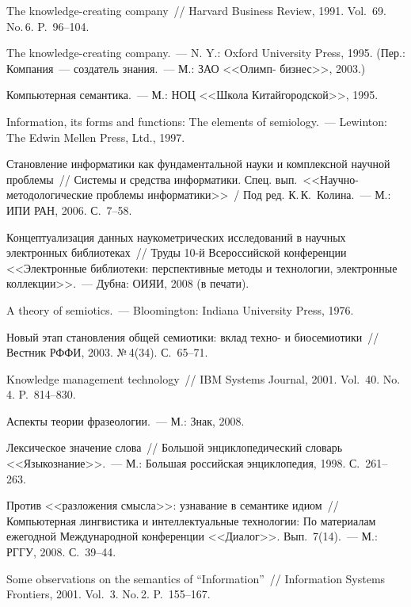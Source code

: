 \begin{multicols}{2}
{{\begin{thebibliography}{99}
The knowledge-creating company~// Harvard Business Review, 1991. Vol.~69. No.\,6.
P.~96--104.

The knowledge-creating company.~--- N. Y.: Oxford University Press, 1995. (Пер.: 
 Компания~--- создатель знания.~--- М.: ЗАО <<Олимп-
бизнес>>, 2003.)

Компьютерная семантика.~--- М.: НОЦ <<Школа Китайгородской>>, 1995.

Information, its forms and functions: The elements of semiology.~--- Lewinton: The Edwin Mellen
Press, Ltd., 1997.

Становление информатики как фундаментальной науки и комплексной научной проблемы~//
Системы и средства информатики. Спец. вып.\ <<Научно-методологические проблемы
информатики>>~/ Под ред. К.\,К.~Колина.~--- М.: ИПИ РАН, 2006. С.~7--58.

Концептуализация данных науко\-мет\-ри\-ческих исследований в научных электронных
биб\-лиотеках~// Труды 10-й Всероссийской конференции <<Электронные библиотеки:
перспективные методы и технологии, электронные коллекции>>.~--- Дубна: ОИЯИ, 2008 (в
печати).

A theory of semiotics.~--- Bloomington: Indiana University Press, 1976.

Новый этап становления общей семиотики: вклад техно- и биосемиотики~// Вестник \mbox{РФФИ},
2003. №\,4(34). С.~65--71.


Knowledge management technology~// IBM Systems Journal, 2001. Vol.~40. No.\,4.
P.~814--830.

Аспекты теории фразеологии.~---  М.: Знак, 2008.

Лексическое значение слова~// Большой энциклопедический словарь
<<Языкознание>>.~--- М.: Большая российская энциклопедия, 1998. С.~261--263.

Против <<разложения смысла>>: узнавание в семантике идиом~// Компьютерная
лингвистика и интеллектуальные технологии: По материалам ежегодной Международной
конференции <<Диалог>>. Вып.~7(14).~--- М.: РГГУ, 2008.  С.~39--44.

Some observations on the semantics of ``Information''~// Information Systems Frontiers, 2001.
Vol.~3. No.\,2. P.~155--167.


\end{thebibliography}}}
\end{multicols}
